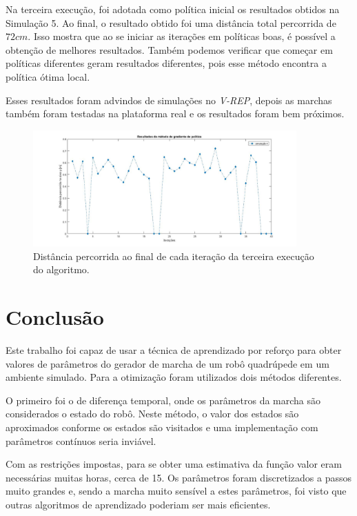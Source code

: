 \documentclass[12pt]{report}
\begin{document}
Na terceira execução, foi adotada como política inicial os resultados obtidos na Simulação 5. Ao final, o resultado obtido foi uma distância total percorrida de $72 cm$. Isso mostra que ao se iniciar as iterações em políticas boas, é possível a obtenção de melhores resultados. Também podemos verificar que começar em políticas diferentes geram resultados diferentes, pois esse método encontra a política ótima local.

Esses resultados foram advindos de simulações no \emph{V-REP}, depois as marchas também foram testadas na plataforma real e os resultados foram bem próximos.

\begin{figure}[ht!]
\centering
\includegraphics[width=0.9\textwidth]{imagens/resultados/marcha4.jpg}
\caption{Distância percorrida ao final de cada iteração da terceira execução do algoritmo.}
\label{fig:marcha4}
\end{figure}


\vspace*{-0.6cm}
\chapter*{Conclusão}
\vspace*{-0.75cm}

Este trabalho foi capaz de usar a técnica de aprendizado por reforço para obter valores de parâmetros do gerador de marcha de um robô quadrúpede em um ambiente simulado. Para a otimização foram utilizados dois métodos diferentes.

O primeiro foi o de diferença temporal, onde os parâmetros da marcha são considerados o estado do robô. Neste método, o valor dos estados são aproximados conforme os estados são visitados e uma implementação com parâmetros contínuos seria inviável. 

Com as restrições impostas, para se obter uma estimativa da função valor eram necessárias muitas horas, cerca de 15. Os parâmetros foram discretizados a passos muito grandes e, sendo a marcha muito sensível a estes parâmetros, foi visto que outras algoritmos de aprendizado poderiam ser mais eficientes.
\end{document}
